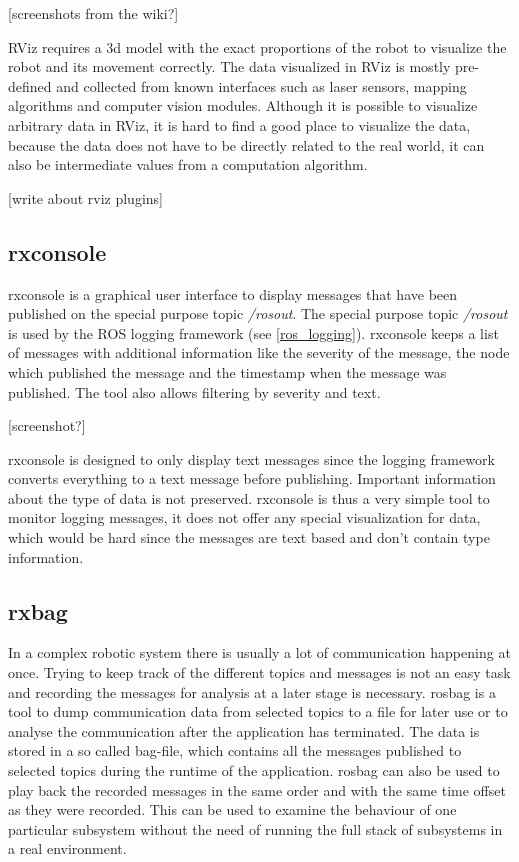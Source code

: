 [screenshots from the wiki?]

RViz requires a 3d model with the exact proportions of the robot to visualize the robot and its movement correctly. The data visualized in RViz is mostly pre-defined and collected from known interfaces such as laser sensors, mapping algorithms and computer vision modules. Although it is possible to visualize arbitrary data in RViz, it is hard to find a good place to visualize the data, because the data does not have to be directly related to the real world, it can also be intermediate values from a computation algorithm.

[write about rviz plugins]

\subsection{rxconsole}
rxconsole is a graphical user interface to display messages that have been published on the special purpose topic \emph{/rosout}. The special purpose topic \emph{/rosout} is used by the ROS logging framework (see \ref{ros_logging}). rxconsole keeps a list of messages with additional information like the severity of the message, the node which published the message and the timestamp when the message was published. The tool also allows filtering by severity and text.

[screenshot?]

rxconsole is designed to only display text messages since the logging framework converts everything to a text message before publishing. Important information about the type of data is not preserved. rxconsole is thus a very simple tool to monitor logging messages, it does not offer any special visualization for data, which would be hard since the messages are text based and don't contain type information.

\subsection{rxbag}
In a complex robotic system there is usually a lot of communication happening at once. Trying to keep track of the different topics and messages is not an easy task and recording the messages for analysis at a later stage is necessary. rosbag is a tool to dump communication data from selected topics to a file for later use or to analyse the communication after the application has terminated. The data is stored in a so called bag-file, which contains all the messages published to selected topics during the runtime of the application. rosbag can also be used to play back the recorded messages in the same order and with the same time offset as they were recorded. This can be used to examine the behaviour of one particular subsystem without the need of running the full stack of subsystems in a real environment.

